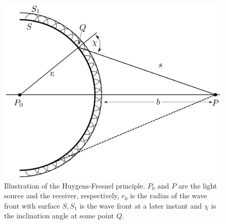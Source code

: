 \begin{figure}
    \includegraphics[width=\linewidth]{figures/appendix/huygens-fresnel.png}
    \caption{Illustration of the Huygens-Fresnel principle. \(P_0\) and \(P\) are the light source and the receiver, respectively, \(r_0\) is the
        radius of the wave front with surface \(S,S_1\) is the wave front at a later instant and \(\chi\) is the inclination angle at some point
        \(Q\).}\label{fig:huygensfresnel}
\end{figure}

